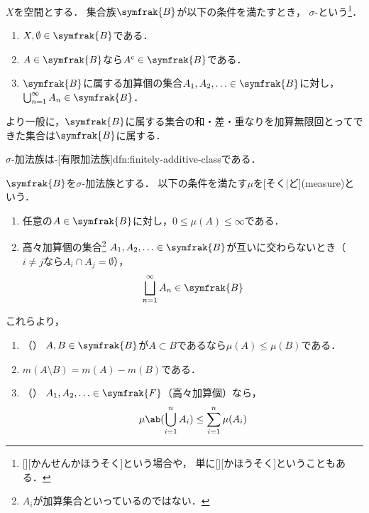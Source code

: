 \documentclass[../sotsu.tex]{subfiles}
\begin{document}
\begin{definition}
    $X$を空間とする．
    集合族$\symfrak{B}$が以下の条件を満たすとき，
    $\sigma$-という\footnote{
        [][かんせんかほうそく]という場合や，
        単に[][かほうそく]ということもある．
    }．
    \begin{enumerate}
        \item $X, \emptyset \in \symfrak{B}$である．
        \item $A \in \symfrak{B}$なら$A^{\mathrm{c}} \in \symfrak{B}$である．
        \item $\symfrak{B}$に属する加算個の集合$A_1, A_2, \dotsc \in \symfrak{B}$に対し，
            \(  \bigcup_{n=1}^{\infty} A_n  \in  \symfrak{B}  \)．
    \end{enumerate}
    より一般に，$\symfrak{B}$に属する集合の和・差・重なりを加算無限回とってできた集合は$\symfrak{B}$に属する．
\end{definition}

$\sigma$-加法族は-[有限加法族]{dfn:finitely-additive-class}である．



\begin{definition}
    $\symfrak{B}$を$\sigma$-加法族とする．
    以下の条件を満たす$\mu$を[そく|ど](measure)という．
    \begin{enumerate}
        \item 任意の$A \in \symfrak{B}$に対し，$0 \leq \mu(A) \leq \infty$である．
        \item 高々加算個の集合\footnote{$A_i$が加算集合といっているのではない．}%
            $A_1, A_2, \dotsc \in \symfrak{B}$が互いに交わらないとき（$i \neq j$なら$A_i \cap A_j = \emptyset$），
            \[  \bigsqcup_{n=1}^{\infty} A_n  \in  \symfrak{B}  \]
    \end{enumerate}
    これらより，
    \begin{enumerate}[resume]
        \item \label{content-measure:monotonicity}（）
            $A, B \in \symfrak{B}$が$A \subset B$であるなら$\mu(A) \leq \mu(B)$である．
        \item $m(A \setminus B) = m(A) - m(B)$である．
        \item \label{content-measure:subadditivity}（）
            $A_1, A_2, \dotsc \in \symfrak{F}$（高々加算個）なら，
            \begin{equation*}
                \mu \ab( \bigcup_{i=1}^{n} A_i ) \leq \sum_{i=1}^{n} \mu(A_i)
            \end{equation*}
    \end{enumerate}
\end{definition}
\end{document}
